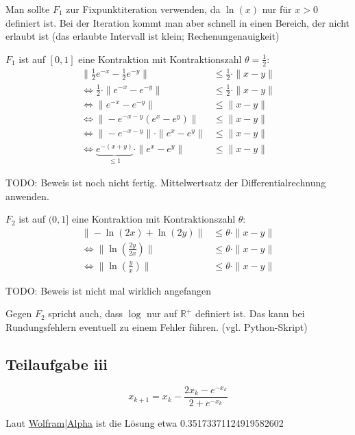 Man sollte $F_1$ zur Fixpunktiteration verwenden, da $\ln(x)$ nur für
$x>0$ definiert ist. Bei der Iteration kommt man aber schnell in
einen Bereich, der nicht erlaubt ist (das erlaubte Intervall ist klein;
Rechenungenauigkeit)

$F_1$ ist auf $[0,1]$ eine Kontraktion mit Kontraktionszahl $\theta = \frac{1}{2}$:
\begin{align}
    \|\frac{1}{2} e^{-x} - \frac{1}{2} e^{-y}\| &\leq \frac{1}{2} \cdot \|x-y\|\\
    \Leftrightarrow \frac{1}{2} \cdot \| e^{-x} - e^{-y}\| &\leq \frac{1}{2} \cdot \|x-y\|\\
    \Leftrightarrow \| e^{-x} - e^{-y}\| &\leq \|x-y\|\\
    \Leftrightarrow \| -e^{-x-y}(e^{x} - e^{y})\| &\leq \|x-y\|\\
    \Leftrightarrow \|-e^{-x-y} \| \cdot \|e^{x} - e^{y}\| &\leq \|x-y\|\\
    \Leftrightarrow \underbrace{e^{-(x+y)}}_{\leq 1} \cdot \|e^{x} - e^{y}\| &\leq \|x-y\|
\end{align}

TODO: Beweis ist noch nicht fertig. Mittelwertsatz der Differentialrechnung
anwenden.

$F_2$ ist auf $(0,1]$ eine Kontraktion mit Kontraktionszahl $\theta$:
\begin{align}
    \|- \ln (2x) + \ln(2y) \| &\leq \theta \cdot \|x-y\|\\
    \Leftrightarrow \| \ln(\frac{2y}{2x}) \| &\leq \theta \cdot \|x-y\|\\
    \Leftrightarrow \| \ln(\frac{y}{x}) \| &\leq \theta \cdot \|x-y\|
\end{align}

TODO: Beweis ist nicht mal wirklich angefangen

Gegen $F_2$ spricht auch, dass $\log$ nur auf $\mathbb{R}^+$ definiert
ist. Das kann bei Rundungsfehlern eventuell zu einem Fehler führen.
(vgl. Python-Skript)

\subsection*{Teilaufgabe iii}
\[x_{k+1} = x_k - \frac{2x_k - e^{-x_k}}{2 + e^{-x_k}}\]

Laut \href{http://www.wolframalpha.com/input/?i=2x-e%5E(-x)%3D0}{Wolfram|Alpha} ist die Lösung etwa 0.35173371124919582602
